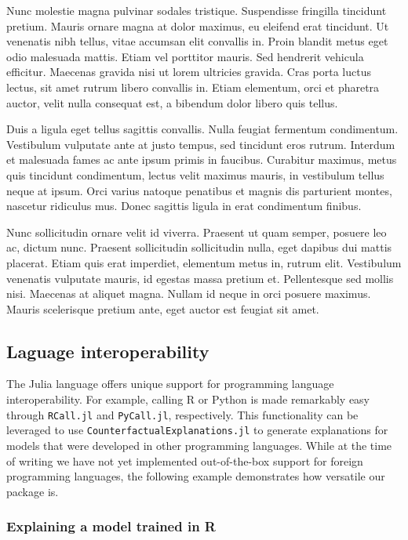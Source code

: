 \documentclass[
  letterpaper,
  DIV=11,
  numbers=noendperiod]{scrartcl}
\begin{document}
Nunc molestie magna pulvinar sodales tristique. Suspendisse fringilla
tincidunt pretium. Mauris ornare magna at dolor maximus, eu eleifend
erat tincidunt. Ut venenatis nibh tellus, vitae accumsan elit convallis
in. Proin blandit metus eget odio malesuada mattis. Etiam vel porttitor
mauris. Sed hendrerit vehicula efficitur. Maecenas gravida nisi ut lorem
ultricies gravida. Cras porta luctus lectus, sit amet rutrum libero
convallis in. Etiam elementum, orci et pharetra auctor, velit nulla
consequat est, a bibendum dolor libero quis tellus.

Duis a ligula eget tellus sagittis convallis. Nulla feugiat fermentum
condimentum. Vestibulum vulputate ante at justo tempus, sed tincidunt
eros rutrum. Interdum et malesuada fames ac ante ipsum primis in
faucibus. Curabitur maximus, metus quis tincidunt condimentum, lectus
velit maximus mauris, in vestibulum tellus neque at ipsum. Orci varius
natoque penatibus et magnis dis parturient montes, nascetur ridiculus
mus. Donec sagittis ligula in erat condimentum finibus.

Nunc sollicitudin ornare velit id viverra. Praesent ut quam semper,
posuere leo ac, dictum nunc. Praesent sollicitudin sollicitudin nulla,
eget dapibus dui mattis placerat. Etiam quis erat imperdiet, elementum
metus in, rutrum elit. Vestibulum venenatis vulputate mauris, id egestas
massa pretium et. Pellentesque sed mollis nisi. Maecenas at aliquet
magna. Nullam id neque in orci posuere maximus. Mauris scelerisque
pretium ante, eget auctor est feugiat sit amet.

\hypertarget{laguage-interoperability}{%
\subsection{Laguage interoperability}\label{laguage-interoperability}}

The Julia language offers unique support for programming language
interoperability. For example, calling R or Python is made remarkably
easy through \texttt{RCall.jl} and \texttt{PyCall.jl}, respectively.
This functionality can be leveraged to use
\texttt{CounterfactualExplanations.jl} to generate explanations for
models that were developed in other programming languages. While at the
time of writing we have not yet implemented out-of-the-box support for
foreign programming languages, the following example demonstrates how
versatile our package is.

\hypertarget{explaining-a-model-trained-in-r}{%
\subsubsection{Explaining a model trained in
R}\label{explaining-a-model-trained-in-r}}
\end{document}
